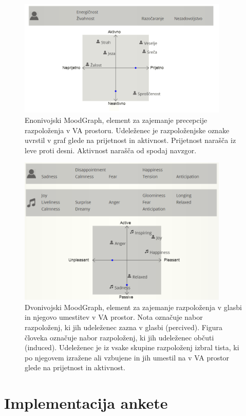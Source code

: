 \documentclass[a4paper, 12pt]{book}
\begin{document}
{\begin{figure}[ht]
\centering
\includegraphics[width=10cm]{images/enomoodgraph.png}

\caption{Enonivojski MoodGraph, element za zajemanje precepcije razpoloženja v VA prostoru. Udeleženec je razpoloženjske oznake uvrstil v graf glede na prijetnost in aktivnost. Prijetnost narašča iz leve proti desni. Aktivnost narašča od spodaj navzgor. }
\label{moodgraph}
\end{figure}

\begin{figure}[hbt]
\centering
\includegraphics[width=10cm]{images/moodgraphdvo.png}

\caption{Dvonivojski MoodGraph, element za zajemanje razpoloženja v glasbi in njegovo umestitev v VA prostor. Nota označuje nabor razpoloženj, ki jih udeleženec zazna v glasbi (percived). Figura človeka označuje nabor razpoloženj, ki jih udeleženec občuti (induced). Udeleženec je iz vsake skupine razpoloženj izbral tista, ki po njegovem izražene ali vzbujene in jih umestil na v VA prostor glede na prijetnost in aktivnost.}
\label{moodgraphdvo}
\end{figure}

\section{Implementacija ankete}

}
\end{document}
